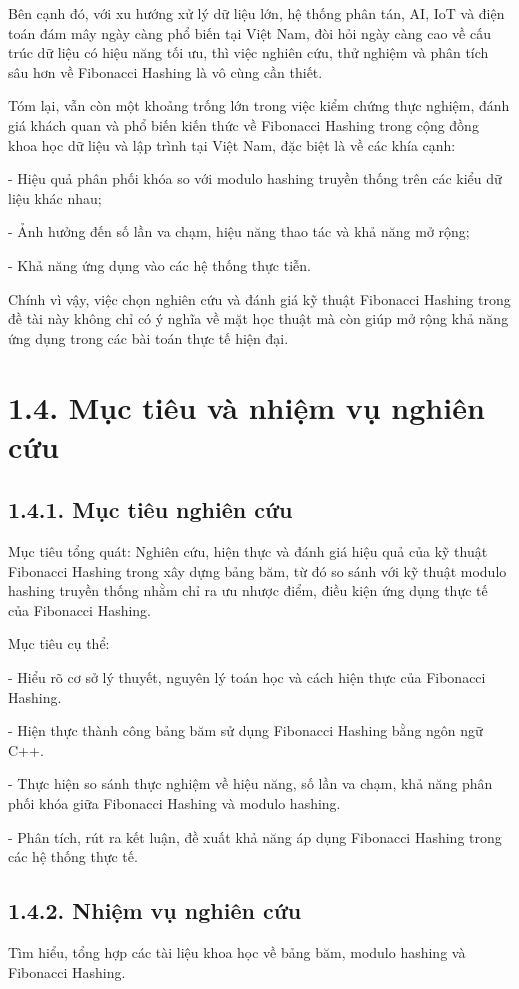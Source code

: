 \documentclass[12pt,a4paper]{report}
\begin{document}
Bên cạnh đó, với xu hướng xử lý dữ liệu lớn, hệ thống phân tán, AI, IoT và điện toán đám mây ngày càng phổ biến tại Việt Nam, đòi hỏi ngày càng cao về cấu trúc dữ liệu có hiệu năng tối ưu, thì việc nghiên cứu, thử nghiệm và phân tích sâu hơn về Fibonacci Hashing là vô cùng cần thiết.

Tóm lại, vẫn còn một khoảng trống lớn trong việc kiểm chứng thực nghiệm, đánh giá khách quan và phổ biến kiến thức về Fibonacci Hashing trong cộng đồng khoa học dữ liệu và lập trình tại Việt Nam, đặc biệt là về các khía cạnh:

- Hiệu quả phân phối khóa so với modulo hashing truyền thống trên các kiểu dữ liệu khác nhau;

- Ảnh hưởng đến số lần va chạm, hiệu năng thao tác và khả năng mở rộng;

- Khả năng ứng dụng vào các hệ thống thực tiễn.

Chính vì vậy, việc chọn nghiên cứu và đánh giá kỹ thuật Fibonacci Hashing trong đề tài này không chỉ có ý nghĩa về mặt học thuật mà còn giúp mở rộng khả năng ứng dụng trong các bài toán thực tế hiện đại.

\section*{1.4. Mục tiêu và nhiệm vụ nghiên cứu}
\subsection*{1.4.1. Mục tiêu nghiên cứu}
\noindent \indent Mục tiêu tổng quát: Nghiên cứu, hiện thực và đánh giá hiệu quả của kỹ thuật Fibonacci Hashing trong xây dựng bảng băm, từ đó so sánh với kỹ thuật modulo hashing truyền thống nhằm chỉ ra ưu nhược điểm, điều kiện ứng dụng thực tế của Fibonacci Hashing.

Mục tiêu cụ thể:

- Hiểu rõ cơ sở lý thuyết, nguyên lý toán học và cách hiện thực của Fibonacci Hashing.

- Hiện thực thành công bảng băm sử dụng Fibonacci Hashing bằng ngôn ngữ C++.

- Thực hiện so sánh thực nghiệm về hiệu năng, số lần va chạm, khả năng phân phối khóa giữa Fibonacci Hashing và modulo hashing.

- Phân tích, rút ra kết luận, đề xuất khả năng áp dụng Fibonacci Hashing trong các hệ thống thực tế.
\subsection*{1.4.2. Nhiệm vụ nghiên cứu}
\noindent \indent Tìm hiểu, tổng hợp các tài liệu khoa học về bảng băm, modulo hashing và Fibonacci Hashing.
\end{document}
